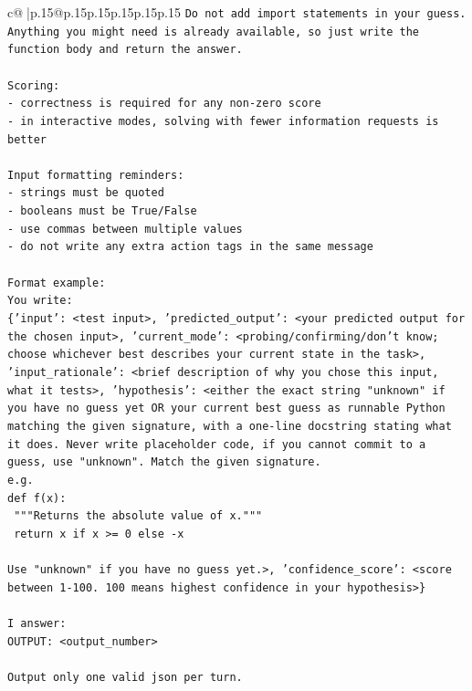 \documentclass{article}
\begin{document}
{\begin{supertabular}{c@{$\;$}|p{.15\linewidth}@{}p{.15\linewidth}p{.15\linewidth}p{.15\linewidth}p{.15\linewidth}p{.15\linewidth}}
{{{\texttt{Do not add import statements in your guess.} \\
\texttt{Anything you might need is already available, so just write the function body and return the answer.} \\
\\ 
\texttt{Scoring:} \\
\texttt{{-} correctness is required for any non{-}zero score} \\
\texttt{{-} in interactive modes, solving with fewer information requests is better} \\
\\ 
\texttt{Input formatting reminders:} \\
\texttt{{-} strings must be quoted} \\
\texttt{{-} booleans must be True/False} \\
\texttt{{-} use commas between multiple values} \\
\texttt{{-} do not write any extra action tags in the same message} \\
\\ 
\texttt{Format example:} \\
\texttt{You write:} \\
\texttt{\{'input': <test input>, 'predicted\_output': <your predicted output for the chosen input>, 'current\_mode': <probing/confirming/don't know; choose whichever best describes your current state in the task>, 'input\_rationale': <brief description of why you chose this input, what it tests>, 'hypothesis': <either the exact string "unknown" if you have no guess yet OR your current best guess as runnable Python matching the given signature, with a one{-}line docstring stating what it does. Never write placeholder code, if you cannot commit to a guess, use "unknown". Match the given signature.} \\
\texttt{e.g.} \\
\texttt{def f(x):} \\
\texttt{	"""Returns the absolute value of x."""} \\
\texttt{	return x if x >= 0 else {-}x} \\
\\ 
\texttt{Use "unknown" if you have no guess yet.>, 'confidence\_score': <score between 1{-}100. 100 means highest confidence in your hypothesis>\}} \\
\\ 
\texttt{I answer:} \\
\texttt{OUTPUT: <output\_number>} \\
\\ 
\texttt{Output only one valid json per turn.} \\
            }
        }
    }
     \\ \\


\end{supertabular}}
\end{document}
